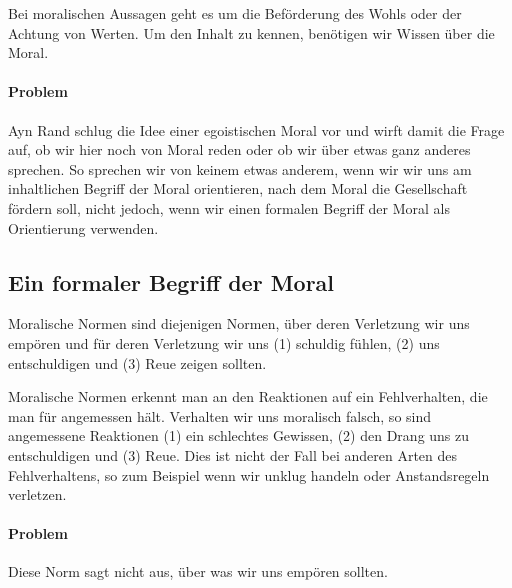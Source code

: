 \documentclass[../main.tex]{subfiles}
\begin{document}
Bei moralischen Aussagen geht es um die Beförderung des Wohls oder der Achtung von Werten. Um den Inhalt zu kennen, benötigen wir Wissen über die Moral.

\paragraph{Problem} Ayn Rand schlug die Idee einer egoistischen Moral vor und wirft damit die Frage auf, ob wir hier noch von Moral reden oder ob wir über etwas ganz anderes sprechen. So sprechen wir von keinem etwas anderem, wenn wir wir uns am inhaltlichen Begriff der Moral orientieren, nach dem Moral die Gesellschaft fördern soll, nicht jedoch, wenn wir einen formalen Begriff der Moral als Orientierung verwenden. 

\subsection{Ein formaler Begriff der Moral}
\begin{warningbox}
Moralische Normen sind diejenigen Normen, über deren Verletzung wir uns empören und für deren Verletzung wir uns (1) schuldig fühlen, (2) uns entschuldigen und (3) Reue zeigen sollten.
\end{warningbox}

Moralische Normen erkennt man an den Reaktionen auf ein Fehlverhalten, die man für angemessen hält. Verhalten wir uns moralisch falsch, so sind angemessene Reaktionen (1) ein schlechtes Gewissen, (2) den Drang uns zu entschuldigen und (3) Reue. Dies ist nicht der Fall bei anderen Arten des Fehlverhaltens, so zum Beispiel wenn wir unklug handeln oder Anstandsregeln verletzen. 

\paragraph{Problem} Diese Norm sagt nicht aus, über was wir uns empören sollten. 
\end{document}
